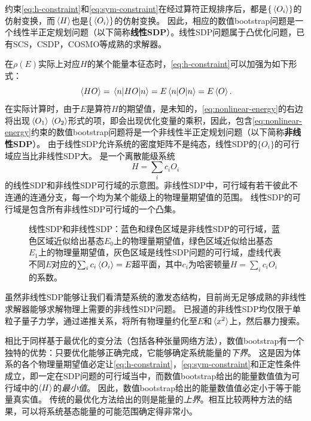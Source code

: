 \documentclass[oneside]{fduthesis}
\newcommand{\concept}[1]{\textbf{#1}}
\begin{document}
约束\eqref{eq:h-constraint}和\eqref{eq:sym-constraint}在经过算符正规排序后，都是$\{\expval*{O_i}\}$的仿射变换，而$\expval*{H}$也是$\{\expval*{O_i}\}$的仿射变换。
因此，相应的数值bootstrap问题是一个线性半正定规划问题（以下简称\concept{线性SDP}）。线性SDP问题属于凸优化问题\cite{vandenberghe1996semidefinite,Bofill_2014}，已有SCS\cite{scs,ocpb:16}，CSDP\cite{csdp}，COSMO\cite{Garstka_2021}等成熟的求解器。

在$\rho(E)$实际上对应$H$的某个能量本征态时，\eqref{eq:h-constraint}可以加强为如下形式：
\begin{equation}
    \expval*{HO} = \mel{n}{H O}{n} = E \mel{n}{O}{n} = E \expval*{O}.
    \label{eq:nonlinear-energy}
\end{equation}
在实际计算时，由于$E$是算符$H$的期望值，是未知的，\eqref{eq:nonlinear-energy}的右边将出现$\expval*{O_1} \expval*{O_2}$形式的项，即会出现优化变量的乘积，因此，包含\eqref{eq:nonlinear-energy}约束的数值bootstrap问题将是一个非线性半正定规划问题（以下简称\concept{非线性SDP}）。
由于线性SDP允许系统的密度矩阵不是纯态，线性SDP的$\{O_i\}$的可行域应当比非线性SDP大。
是一个离散能级系统
\begin{equation}
    H = \sum_i c_i O_i
\end{equation}
的线性SDP和非线性SDP可行域的示意图。非线性SDP中，可行域有若干彼此不连通的连通分支，每一个均为某个能级上的物理量期望值的范围。
线性SDP的可行域是包含所有非线性SDP可行域的一个凸集。

\begin{figure}
    \centering
    
    \caption{线性SDP和非线性SDP：蓝色和绿色区域是非线性SDP的可行域，蓝色区域近似给出基态$E_0$上的物理量期望值，绿色区域近似给出基态$E_1$上的物理量期望值，灰色区域是线性SDP问题的可行域，虚线代表不同$E$对应的$\sum_i c_i \expval{O_i} = E$超平面，其中$c_i$为哈密顿量$H = \sum_i c_i O_i$的系数。}
    \label{fig:feasibility-compare}
\end{figure}

虽然非线性SDP能够让我们看清楚系统的激发态结构，目前尚无足够成熟的非线性求解器能够求解物理上需要的非线性SDP问题\cite{kazakov2021analytic}。
已报道的非线性SDP均仅限于单粒子量子力学，通过递推关系，将所有物理量约化至$E$和$\expval*{x^2}$上，然后暴力搜索\cite{han_matrix,bhattacharya2021}。

相比于同样基于最优化的变分法（包括各种张量网络方法），数值bootstrap有一个独特的优势：只要优化能够正确完成，它能够确定系统能量的\emph{下界}。
这是因为体系的各个物理量期望值必定让\eqref{eq:h-constraint}，\eqref{eq:sym-constraint}和正定性条件成立，即一定在SDP问题的可行域当中，而数值bootstrap给出的能量数值值为可行域中的$\expval{H}$的\emph{最小值}。
因此，数值bootstrap给出的能量数值值必定小于等于能量真实值。
传统的最优化方法给出的则是能量的\emph{上界}。相互比较两种方法的结果，可以将系统基态能量的可能范围确定得非常小。
\end{document}
